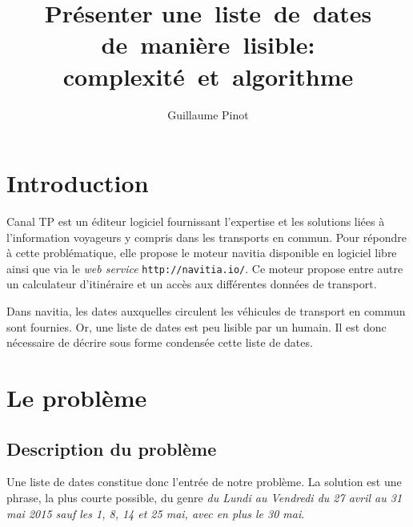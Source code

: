 \documentclass{roadef}
\begin{document}
\title{Présenter une~liste~de~dates de~manière~lisible: complexité~et~algorithme}

\def\shorttitle{Présenter une~liste~de~dates de~manière~lisible}

\author{Guillaume Pinot}

{}

\maketitle
\thispagestyle{empty}



\section{Introduction}

Canal TP est un éditeur logiciel fournissant l'expertise et les
solutions liées à l'information voyageurs y compris dans les
transports en commun. Pour répondre à cette problématique, elle
propose le moteur navitia disponible en logiciel libre ainsi que via
le \emph{web service} \texttt{http://navitia.io/}. Ce moteur propose
entre autre un calculateur d'itinéraire et un accès aux différentes
données de transport.

Dans navitia, les dates auxquelles circulent les véhicules de
transport en commun sont fournies.  Or, une liste de dates est peu
lisible par un humain. Il est donc nécessaire de décrire sous forme
condensée cette liste de dates.

\section{Le problème}

\subsection{Description du problème}

Une liste de dates constitue donc l'entrée de notre problème. La
solution est une phrase, la plus courte possible, du genre \emph{du
  Lundi au Vendredi du 27 avril au 31 mai 2015 sauf les 1, 8, 14 et 25
  mai, avec en plus le 30 mai}.
\end{document}
